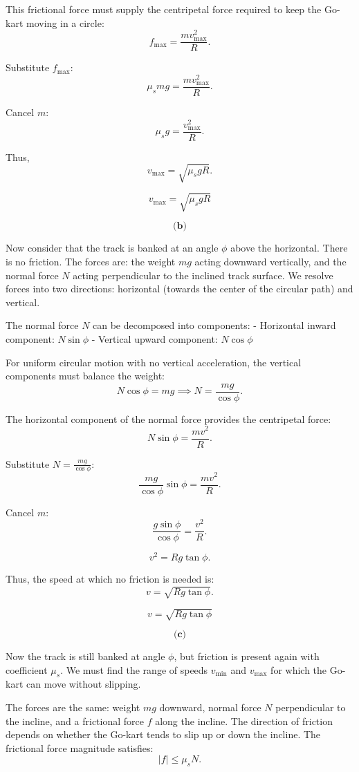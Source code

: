 \documentclass{article}
\begin{document}
This frictional force must supply the centripetal force required to keep the Go-kart moving in a circle:
\[
f_{\text{max}} = \frac{mv_{\text{max}}^2}{R}.
\]

Substitute $f_{\text{max}}$:
\[
\mu_s mg = \frac{m v_{\text{max}}^2}{R}.
\]

Cancel $m$:
\[
\mu_s g = \frac{v_{\text{max}}^2}{R}.
\]

Thus,
\[
v_{\text{max}} = \sqrt{\mu_s g R}.
\]

\[
\boxed{v_{\text{max}} = \sqrt{\mu_s g R}}
\]

\[
\textbf{(b)}
\]

Now consider that the track is banked at an angle $\phi$ above the horizontal. There is no friction. The forces are: the weight $mg$ acting downward vertically, and the normal force $N$ acting perpendicular to the inclined track surface. We resolve forces into two directions: horizontal (towards the center of the circular path) and vertical.

The normal force $N$ can be decomposed into components:
- Horizontal inward component: $N \sin\phi$
- Vertical upward component: $N \cos\phi$

For uniform circular motion with no vertical acceleration, the vertical components must balance the weight:
\[
N \cos\phi = mg \implies N = \frac{mg}{\cos\phi}.
\]

The horizontal component of the normal force provides the centripetal force:
\[
N \sin\phi = \frac{mv^2}{R}.
\]

Substitute $N = \frac{mg}{\cos\phi}$:
\[
\frac{mg}{\cos\phi}\sin\phi = \frac{m v^2}{R}.
\]

Cancel $m$:
\[
\frac{g \sin\phi}{\cos\phi} = \frac{v^2}{R}.
\]

\[
v^2 = R g \tan\phi.
\]

Thus, the speed at which no friction is needed is:
\[
v = \sqrt{R g \tan\phi}.
\]

\[
\boxed{v = \sqrt{R g \tan\phi}}
\]

\[
\textbf{(c)}
\]

Now the track is still banked at angle $\phi$, but friction is present again with coefficient $\mu_s$. We must find the range of speeds $v_{\min}$ and $v_{\max}$ for which the Go-kart can move without slipping.

The forces are the same: weight $mg$ downward, normal force $N$ perpendicular to the incline, and a frictional force $f$ along the incline. The direction of friction depends on whether the Go-kart tends to slip up or down the incline. The frictional force magnitude satisfies:
\[
|f| \leq \mu_s N.
\]
\end{document}
